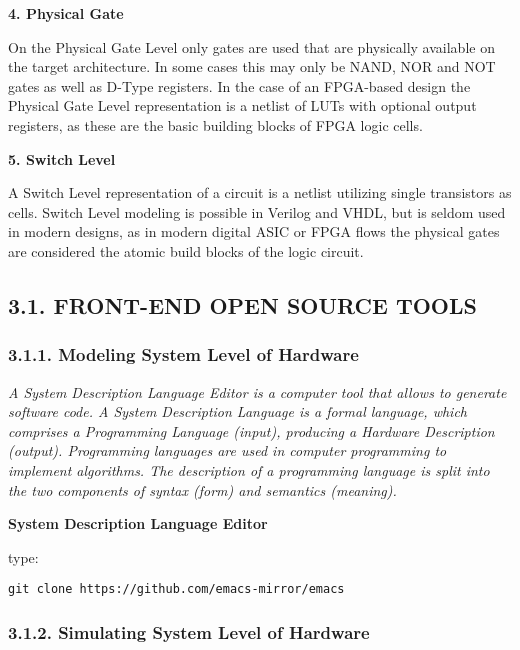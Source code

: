 \documentclass[]{article}
\begin{document}
\textbf{4. Physical Gate}

On the Physical Gate Level only gates are used that are physically
available on the target architecture. In some cases this may only be
NAND, NOR and NOT gates as well as D-Type registers. In the case of an
FPGA-based design the Physical Gate Level representation is a netlist of
LUTs with optional output registers, as these are the basic building
blocks of FPGA logic cells.

\textbf{5. Switch Level}

A Switch Level representation of a circuit is a netlist utilizing single
transistors as cells. Switch Level modeling is possible in Verilog and
VHDL, but is seldom used in modern designs, as in modern digital ASIC or
FPGA flows the physical gates are considered the atomic build blocks of
the logic circuit.

\subsection{3.1. FRONT-END OPEN SOURCE
TOOLS}\label{front-end-open-source-tools}

\subsubsection{3.1.1. Modeling System Level of
Hardware}\label{modeling-system-level-of-hardware}

\emph{A System Description Language Editor is a computer tool that
allows to generate software code. A System Description Language is a
formal language, which comprises a Programming Language (input),
producing a Hardware Description (output). Programming languages are
used in computer programming to implement algorithms. The description of
a programming language is split into the two components of syntax (form)
and semantics (meaning).}

\textbf{System Description Language Editor}

type:

\begin{verbatim}
git clone https://github.com/emacs-mirror/emacs
\end{verbatim}

\subsubsection{3.1.2. Simulating System Level of
Hardware}\label{simulating-system-level-of-hardware}
\end{document}
